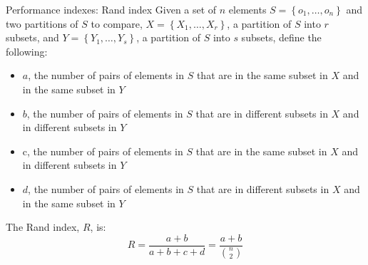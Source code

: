 \begin{frame}{Performance indexes: Rand index}
    Given a set of $n$ elements $S=\left\{o_1, \ldots, o_n\right\}$ and two partitions of $S$ to compare, $X=\left\{X_1, \ldots, X_r\right\}$, a partition of $S$ into $r$ subsets, and $Y=\left\{Y_1, \ldots, Y_s\right\}$, a partition of $S$ into $s$ subsets, define the following:
    \begin{itemize}
        \item $a$, the number of pairs of elements in $S$ that are in the same subset in $X$ and in the same subset in $Y$
        \item $b$, the number of pairs of elements in $S$ that are in different subsets in $X$ and in different subsets in $Y$
        \item c, the number of pairs of elements in $S$ that are in the same subset in $X$ and in different subsets in $Y$
        \item $d$, the number of pairs of elements in $S$ that are in different subsets in $X$ and in the same subset in $Y$
    \end{itemize}
    The Rand index, $R$, is:
    \[
    R=\frac{a+b}{a+b+c+d}=\frac{a+b}{\binom{n}{2}}
    \]
\end{frame}